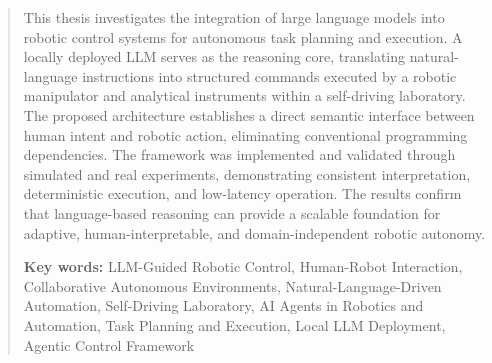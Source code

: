 
\begin{abstract}
This thesis investigates the integration of large language models into robotic control systems for autonomous task planning and execution. A locally deployed LLM serves as the reasoning core, translating natural-language instructions into structured commands executed by a robotic manipulator and analytical instruments within a self-driving laboratory. The proposed architecture establishes a direct semantic interface between human intent and robotic action, eliminating conventional programming dependencies. The framework was implemented and validated through simulated and real experiments, demonstrating consistent interpretation, deterministic execution, and low-latency operation. The results confirm that language-based reasoning can provide a scalable foundation for adaptive, human-interpretable, and domain-independent robotic autonomy.

{\bfseries Key words:} LLM-Guided Robotic Control, Human-Robot Interaction, Collaborative Autonomous Environments, Natural-Language-Driven Automation, Self-Driving Laboratory, AI Agents in Robotics and Automation, Task Planning and Execution, Local LLM Deployment, Agentic Control Framework


\end{abstract}
